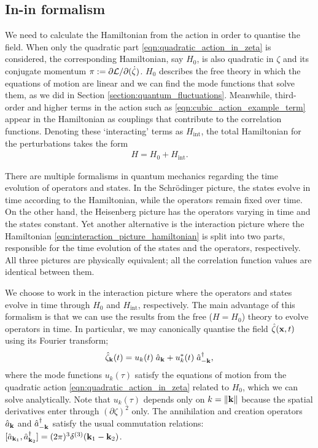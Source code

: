 \subsection{In-in formalism} \label{section:in_in_formalism}

We need to calculate the Hamiltonian from the action in order to quantise the field. When only the quadratic part \eqref{eqn:quadratic_action_in_zeta} is considered, the corresponding Hamiltonian, say $H_0$, is also quadratic in $\zeta$ and its conjugate momentum $\pi := \partial\mathcal{L}/\partial(\dot{\zeta})$. $H_0$ describes the free theory in which the equations of motion are linear and we can find the mode functions that solve them, as we did in Section \ref{section:quantum_fluctuations}. Meanwhile, third-order and higher terms in the action such as \eqref{eqn:cubic_action_example_term} appear in the Hamiltonian as couplings that contribute to the correlation functions. Denoting these `interacting' terms as $H_\text{int}$, the total Hamiltonian for the perturbations takes the form
\begin{align}
	H = H_0 + H_\text{int}. \label{eqn:interaction_picture_hamiltonian}
\end{align}

There are multiple formalisms in quantum mechanics regarding the time evolution of operators and states. In the Schr\"odinger picture, the states evolve in time according to the Hamiltonian, while the operators remain fixed over time. On the other hand, the Heisenberg picture has the operators varying in time and the states constant. Yet another alternative is the interaction picture where the Hamiltonian \eqref{eqn:interaction_picture_hamiltonian} is split into two parts, responsible for the time evolution of the states and the operators, respectively. All three pictures are physically equivalent; all the correlation function values are identical between them.

We choose to work in the interaction picture where the operators and states evolve in time through $H_0$ and $H_\text{int}$, respectively. The main advantage of this formalism is that we can use the results from the free ($H=H_0$) theory to evolve operators in time. In particular, we may canonically quantise the field $\hat{\zeta}(\mathbf{x},t)$ using its Fourier transform;
\begin{align}
	\hat{\zeta}_\mathbf{k} (t) = u_k(t) \; \hat{a}_\mathbf{k} + u_k^*(t) \; \hat{a}_{-\mathbf{k}}^\dagger, \label{eqn:zeta_canonical_quantisation}
\end{align} 
where the mode functions $u_k(\tau)$ satisfy the equations of motion from the quadratic action \eqref{eqn:quadratic_action_in_zeta} related to $H_0$, which we can solve analytically. Note that $u_k(\tau)$ depends only on $k=\|\mathbf{k}\|$ because the spatial derivatives enter through $(\partial\zeta)^2$ only. The annihilation and creation operators $\hat{a}_\mathbf{k}$ and $\hat{a}_{-\mathbf{k}}^\dagger$ satisfy the usual commutation relations: ${[\hat{a}_{\mathbf{k}_1},\hat{a}_{\mathbf{k}_2}^\dagger] = (2\pi)^3 \delta^{(3)}(\mathbf{k}_1-\mathbf{k}_2)}$.

